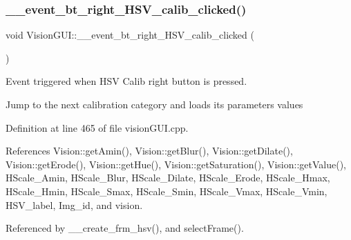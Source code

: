 \subsubsection{\texorpdfstring{\+\_\+\+\_\+event\+\_\+bt\+\_\+right\+\_\+\+H\+S\+V\+\_\+calib\+\_\+clicked()}{\_\_event\_bt\_right\_HSV\_calib\_clicked()}}
{\footnotesize\ttfamily void Vision\+G\+U\+I\+::\+\_\+\+\_\+event\+\_\+bt\+\_\+right\+\_\+\+H\+S\+V\+\_\+calib\+\_\+clicked (\begin{DoxyParamCaption}{ }\end{DoxyParamCaption})\hspace{0.3cm}{\ttfamily [private]}}



Event triggered when H\+SV Calib right button is pressed. 

Jump to the next calibration category and loads its parameters values 

Definition at line 465 of file vision\+G\+U\+I.\+cpp.



References Vision\+::get\+Amin(), Vision\+::get\+Blur(), Vision\+::get\+Dilate(), Vision\+::get\+Erode(), Vision\+::get\+Hue(), Vision\+::get\+Saturation(), Vision\+::get\+Value(), H\+Scale\+\_\+\+Amin, H\+Scale\+\_\+\+Blur, H\+Scale\+\_\+\+Dilate, H\+Scale\+\_\+\+Erode, H\+Scale\+\_\+\+Hmax, H\+Scale\+\_\+\+Hmin, H\+Scale\+\_\+\+Smax, H\+Scale\+\_\+\+Smin, H\+Scale\+\_\+\+Vmax, H\+Scale\+\_\+\+Vmin, H\+S\+V\+\_\+label, Img\+\_\+id, and vision.



Referenced by \+\_\+\+\_\+create\+\_\+frm\+\_\+hsv(), and select\+Frame().


